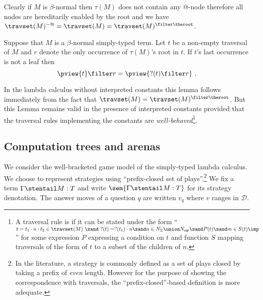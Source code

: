 \begin{remark}
Clearly if $M$ is $\beta$-normal then $\tau(M)$ does not contain any
@-node therefore all nodes are hereditarily enabled by the root and
we have $\travset(M)^{-@} = \travset(M) = \travset(M)^{\filter
\theroot }$.
\end{remark}



\begin{lemma}
\label{lem:betanf_trav_pview_red} Suppose that $M$ is a
$\beta$-normal simply-typed term. Let $t$ be a non-empty traversal
of $M$ and $r$ denote the only occurrence of $\tau(M)$'s root in
$t$. If $t$'s last occurrence is not a leaf then
$$ \pview{t} \filter r = \pview{?(t) \filter  r }\ .$$
\end{lemma}
In the lambda calculus without interpreted constants this lemma
follows immediately from the fact that $\travset(M) =
\travset(M)^{\filter \theroot}$. But this Lemma remains valid in the
presence of interpreted constants provided that the traversal rules
implementing the constants are \emph{well-behaved}\footnote{A
traversal rule is  if it can be stated under
the form ``$t = t_1\cdot n \cdot t_2 \in \travset(M)\ \zand\ ?(t) =
?(t_1) \cdot n \zand n \in N_{\Sigma}\union N_{\sf var} \zand P(t)
\zand m\in S(t) \imp\ $'' for some expression $P$ expressing
a condition on $t$ and function $S$ mapping traversals of the form
of $t$ to a subset of the children of $n$.}.

\subsection{Computation trees and arenas}
We consider the well-bracketed game model of the simply-typed lambda
calculus.  We choose to represent strategies using ``prefix-closed
set of plays''.\footnote{In the literature, a strategy is commonly
defined as a set of plays closed by taking a prefix of \emph{even}
length. However for the purpose of showing the correspondence with
traversals, the ``prefix-closed''-based definition is more
adequate.} We fix a term $\Gamma \stentail M : T$ and write
$\sem{\Gamma \stentail M : T}$ for its strategy denotation. The
answer moves of a question $q$ are written $v_q$ where $v$ ranges in
$\mathcal{D}$.

